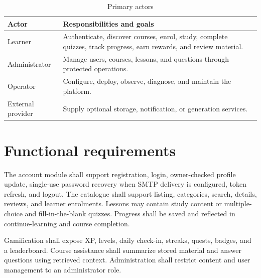 \documentclass[12pt,a4paper,oneside]{report}
\begin{document}
\begin{table}[H]\centering
\caption{Primary actors}
\begin{tabular}{P{0.2\textwidth}P{0.7\textwidth}}\toprule
\textbf{Actor} & \textbf{Responsibilities and goals}\\\midrule
Learner & Authenticate, discover courses, enrol, study, complete quizzes, track
progress, earn rewards, and review material.\\
Administrator & Manage users, courses, lessons, and questions through protected operations.\\
Operator & Configure, deploy, observe, diagnose, and maintain the platform.\\
External provider & Supply optional storage, notification, or generation services.\\
\bottomrule\end{tabular}
\end{table}

\section{Functional requirements}
The account module shall support registration, login, owner-checked profile update,
single-use password recovery when SMTP delivery is configured, token refresh, and
logout. The catalogue shall support listing, categories,
search, details, reviews, and learner enrolments. Lessons may contain study content
or multiple-choice and fill-in-the-blank quizzes. Progress shall be saved and
reflected in continue-learning and course completion.

Gamification shall expose XP, levels, daily check-in, streaks, quests, badges, and a
leaderboard. Course assistance shall summarize stored material and answer questions
using retrieved context. Administration shall restrict content and user management
to an administrator role.
\end{document}
